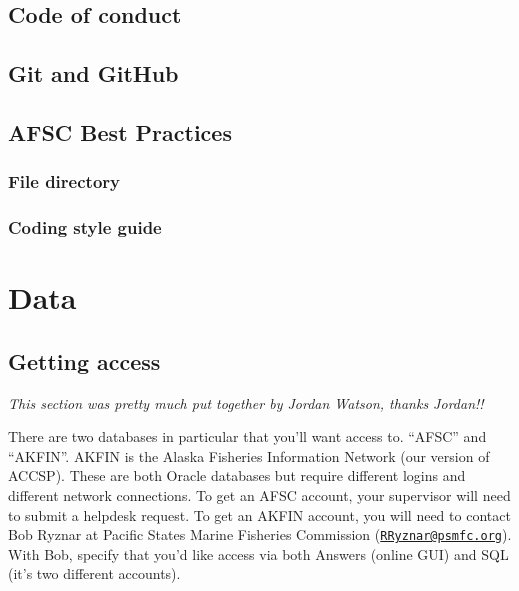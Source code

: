 \documentclass[
]{book}
\begin{document}
\hypertarget{code-of-conduct}{%
\section{Code of conduct}\label{code-of-conduct}}

\hypertarget{git-and-github}{%
\section{Git and GitHub}\label{git-and-github}}

\hypertarget{afsc-best-practices}{%
\section{AFSC Best Practices}\label{afsc-best-practices}}

\hypertarget{file-directory}{%
\subsection{File directory}\label{file-directory}}

\hypertarget{coding-style-guide}{%
\subsection{Coding style guide}\label{coding-style-guide}}

\hypertarget{data}{%
\chapter{Data}\label{data}}

\hypertarget{getting-access}{%
\section{Getting access}\label{getting-access}}

\emph{This section was pretty much put together by Jordan Watson, thanks Jordan!!}

There are two databases in particular that you'll want access to. ``AFSC'' and ``AKFIN''. AKFIN is the Alaska Fisheries Information Network (our version of ACCSP).
These are both Oracle databases but require different logins and different network connections.
To get an AFSC account, your supervisor will need to submit a helpdesk request.
To get an AKFIN account, you will need to contact Bob Ryznar at Pacific States Marine Fisheries Commission (\href{mailto:RRyznar@psmfc.org}{\nolinkurl{RRyznar@psmfc.org}}).
With Bob, specify that you'd like access via both Answers (online GUI) and SQL (it's two different accounts).
\end{document}
